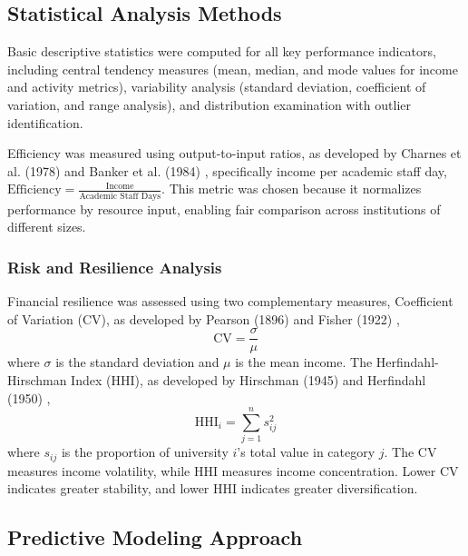 \documentclass[journal,onecolumn, 10pt,draftclsnofoot]{IEEEtran}
\begin{document}
\subsection{Statistical Analysis Methods}

Basic descriptive statistics were computed for all key performance indicators, including central tendency measures (mean, median, and mode values for income and activity metrics), variability analysis (standard deviation, coefficient of variation, and range analysis), and distribution examination with outlier identification.

Efficiency was measured using output-to-input ratios, as developed by Charnes et al. (1978) \cite{charnes1978measuring} and Banker et al. (1984) \cite{banker1984models}, specifically income per academic staff day, $\text{Efficiency} = \frac{\text{Income}}{\text{Academic Staff Days}}$. This metric was chosen because it normalizes performance by resource input, enabling fair comparison across institutions of different sizes.

\subsubsection{Risk and Resilience Analysis}

Financial resilience was assessed using two complementary measures, Coefficient of Variation (CV), as developed by Pearson (1896) \cite{pearson1896contributions} and Fisher (1922) \cite{fisher1922mathematical},
\begin{equation}
\mathrm{CV} = \frac{\sigma}{\mu}
\end{equation}
where $\sigma$ is the standard deviation and $\mu$ is the mean income. The Herfindahl-Hirschman Index (HHI), as developed by Hirschman (1945) \cite{hirschman1945national} and Herfindahl (1950) \cite{herfindahl1950concentration},
\begin{equation}
\mathrm{HHI}_i = \sum_{j=1}^n s_{ij}^2
\end{equation}
where $s_{ij}$ is the proportion of university $i$'s total value in category $j$. The CV measures income volatility, while HHI measures income concentration. Lower CV indicates greater stability, and lower HHI indicates greater diversification.

\subsection{Predictive Modeling Approach}
\end{document}

